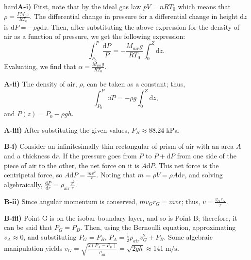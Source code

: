 \begin{solution}{hard}\textbf{A-i)} First, note that by the ideal gas law $pV = nRT_0$ which means that $\rho = \frac{PM_{air}}{RT_0}$. The differential change in pressure for a differential change in height $\mathrm{d}z$ is $\mathrm{d}P = -\rho g\mathrm{d}z$. Then, after substituting the above expression for the density of air as a function of pressure, we get the following expression: 
\[\int_{P_0}^{P} \frac{\mathrm{d}P}{P} = -\frac{M_{air}g}{RT_0}\int_{0}^{Z} \mathrm{d}z.\]
Evaluating, we find that $\alpha = \frac{M_{air}g}{RT_0}$.
\vspace{3mm}

\noindent \textbf{A-ii)} The density of air, $\rho$, can be taken as a constant; thus, \[\int_{P_0}^{P}\dd P = -\rho g\int_{0}^{Z} \mathrm{d}z,\]
and $P(z) = P_0 - \rho gh$.
\vspace{3mm}

\noindent \textbf{A-iii)} After substituting the given values, $P_B \approx 88.24\;\mathrm{kPa}$.
\vspace{3mm}

\noindent \textbf{B-i)} Consider an infinitesimally thin rectangular of prism of air with an area $A$ and a thickness $\mathrm{d}r$. If the pressure goes from $P$ to $P + \mathrm{d}P$ from one side of the piece of air to the other, the net force on it is $A \mathrm{d}P$. This net force is the centripetal force, so $A \mathrm{d}P = \frac{mv^2}{r}$. Noting that $m = \rho V = \rho A\mathrm{d}r$, and solving algebraically, $\frac{\mathrm{d}P}{\mathrm{d}r} = \rho_{\text{air}}\frac{v^2}{r}$.
\vspace{3mm}

\noindent \textbf{B-ii)}  Since angular momentum is conserved, $mv_Gr_G = mvr$; thus, $v = \frac{v_Gr_G}{r}$.
\vspace{3mm}

\noindent \textbf{B-iii)} Point G is on the isobar boundary layer, and so is Point B; therefore, it can be said that $P_G = P_B$. Then, using the Bernoulli equation, approximating $v_A \approx 0$, and substituting $P_G = P_B$, $P_A = \frac{1}{2}\rho_{air}v_G^2 + P_B$. Some algebraic manipulation yields $v_G = \sqrt{\frac{2(P_A - P_B)}{\rho_{\text{air}}}} = \sqrt{2gh} \approx 141\;\mathrm{m/s}$.
\vspace{3mm}


\end{solution}

